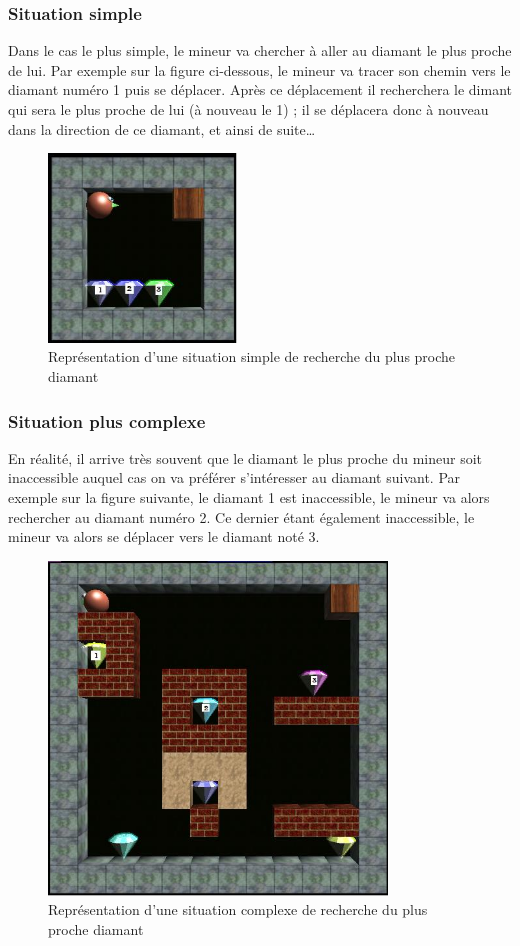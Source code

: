 \documentclass[a4paper,11pt]{article}
\begin{document}
		\subsubsection{Situation simple}
		
Dans le cas le plus simple, le mineur va chercher \`a aller au diamant le plus proche de lui. Par exemple sur la figure ci-dessous, le mineur va tracer son chemin vers le diamant num\'ero 1 puis se d\'eplacer. Apr\`es ce d\'eplacement il recherchera le dimant qui sera le plus proche de lui (\`a nouveau le 1) ; il se d\'eplacera donc \`a nouveau dans la direction de ce diamant, et ainsi de suite\dots

		\begin{figure}[h]
			\center
			\includegraphics[width=5cm]{simple1}
			\caption{\label{simpleRechercheDiamant} Repr\'esentation d'une situation simple de recherche du plus proche diamant}
		\end{figure}
		
		\subsubsection{Situation plus complexe}
		
En r\'ealit\'e, il arrive tr\`es souvent que le diamant le plus proche du mineur soit inaccessible auquel cas on va pr\'ef\'erer s'int\'eresser au diamant suivant. Par exemple sur la figure suivante, le diamant 1 est inaccessible, le mineur va alors rechercher au diamant num\'ero 2. Ce dernier \'etant \'egalement inaccessible, le mineur va alors se d\'eplacer vers le diamant not\'e 3.
	
		\begin{figure}[h]
			\center
			\includegraphics[width=9cm]{simple2}
			\caption{\label{complexeRechercheDiamant} Repr\'esentation d'une situation complexe de recherche du plus proche diamant}
		\end{figure}
		
\end{document}
